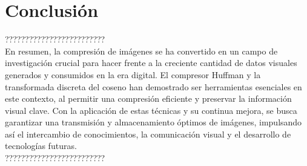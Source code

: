 \documentclass[12pt,a4paper]{article}
\begin{document}
\newpage
\section{Conclusión}

?????????????????????????\\
En resumen, la compresión de imágenes se ha convertido en un campo de investigación crucial para hacer frente a la creciente cantidad de datos visuales generados y consumidos en la era digital. El compresor Huffman y la transformada discreta del coseno han demostrado ser herramientas esenciales en este contexto, al permitir una compresión eficiente y preservar la información visual clave. Con la aplicación de estas técnicas y su continua mejora, se busca garantizar una transmisión y almacenamiento óptimos de imágenes, impulsando así el intercambio de conocimientos, la comunicación visual y el desarrollo de tecnologías futuras.\\
?????????????????????????



\newpage
\nocite{*}
\printbibliography
\end{document}
